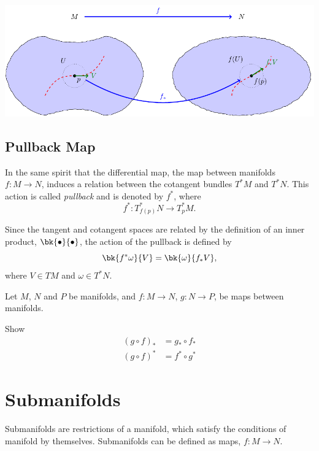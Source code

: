 \begin{center}
  \includegraphics[scale=1]{Pictures/tikz-diffmap.pdf}
\end{center}

\subsection{Pullback Map}

In the same spirit that the differential map, the map between manifolds $f:M\to N$, induces a relation between the cotangent bundles $T^*M$ and $T^*N$. This action is called \emph{pullback} 
and is denoted by $f^*$, where
\begin{equation}
  f^*: T^*_{f(p)}N \to T^*_p M.
\end{equation}

Since the tangent and cotangent spaces are related by the definition of an inner product, $\bk{\bullet}{\bullet}$, the action of the pullback is defined by 
\begin{equation}
  \bk{f^*\omega}{V} = \bk{\omega}{f_*V},
\end{equation}
where $V \in TM$ and $\omega \in T^*N$.

\begin{Ebox}
  Let $M$, $N$ and $P$ be manifolds, and $ f:M\to N$, $g:N\to P$,  be maps between manifolds. 

  Show
  \begin{align*}
    (g\circ f)_* &= g_*\circ f_*\\
    (g\circ f)^* &= f^*\circ g^*
  \end{align*}
\end{Ebox}

\section{Submanifolds}

Submanifolds are restrictions of a manifold, which satisfy the conditions of manifold by themselves. Submanifolds can be defined as maps, $f:M \to N$.

